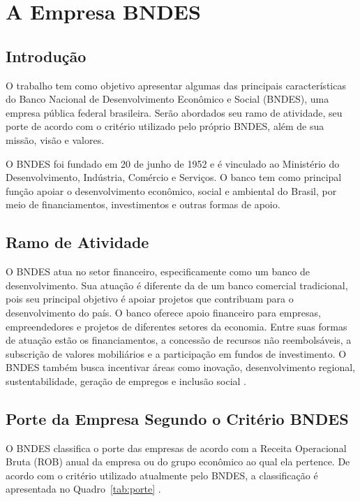 \chapter{A Empresa BNDES}

\section{Introdução}

O trabalho tem como objetivo apresentar algumas das principais características do Banco Nacional de Desenvolvimento Econômico e Social (BNDES), uma empresa pública federal brasileira. Serão abordados seu ramo de atividade, seu porte de acordo com o critério utilizado pelo próprio BNDES, além de sua missão, visão e valores.

O BNDES foi fundado em 20 de junho de 1952 e é vinculado ao Ministério do Desenvolvimento, Indústria, Comércio e Serviços. O banco tem como principal função apoiar o desenvolvimento econômico, social e ambiental do Brasil, por meio de financiamentos, investimentos e outras formas de apoio.

\section{Ramo de Atividade}

O BNDES atua no setor financeiro, especificamente como um banco de desenvolvimento. Sua atuação é diferente da de um banco comercial tradicional, pois seu principal objetivo é apoiar projetos que contribuam para o desenvolvimento do país. O banco oferece apoio financeiro para empresas, empreendedores e projetos de diferentes setores da economia. Entre suas formas de atuação estão os financiamentos, a concessão de recursos não reembolsáveis, a subscrição de valores mobiliários e a participação em fundos de investimento. O BNDES também busca incentivar áreas como inovação, desenvolvimento regional, sustentabilidade, geração de empregos e inclusão social \cite{bndes2026quemsomos}.


\section{Porte da Empresa Segundo o Critério BNDES}

O BNDES classifica o porte das empresas de acordo com a Receita Operacional Bruta (ROB) anual da empresa ou do grupo econômico ao qual ela pertence. De acordo com o critério utilizado atualmente pelo BNDES, a classificação é apresentada no Quadro~\ref{tab:porte} \cite{bndes2026faq}.

